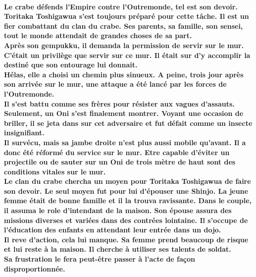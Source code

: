 \documentclass[10pt,a4paper]{book}
\begin{document}
\paragraph{Le crabe défends l’Empire contre l’Outremonde, tel est son devoir. Toritaka Toshigawua s’est toujours préparé pour cette tâche. Il est un fier combattant du clan du crabe. Ses parents, sa famille, son sensei, tout le monde attendait de grandes choses de sa part. \\
Après son gempukku, il demanda la permission de servir sur le mur. C’était un privilège que servir sur ce mur. Il était sur d'y accomplir la destiné que son entourage lui donnait.\\
Hélas, elle a choisi un chemin plus sinueux. A peine, trois jour après son arrivée sur le mur, une attaque a été lancé par les forces de l’Outremonde. \\
Il s'est battu comme ses frères pour résister aux vagues d’assauts. \\
Seulement, un Oni s’est finalement montrer. Voyant une occasion de briller, il se jeta dans sur cet adversaire et fut défait comme un insecte insignifiant.\\ Il survécu, mais sa jambe droite n'est plus aussi mobile qu’avant. Il a donc été réformé du service sur le mur. Etre capable d’éviter un projectile ou de sauter sur un Oni de trois mètre de haut sont des conditions vitales sur le mur.\\
Le clan du crabe chercha un moyen pour Toritaka Toshigawua de faire son devoir. Le seul moyen fut pour lui d’épouser une Shinjo. La jeune femme était de bonne famille et il la trouva ravissante. Dans le couple, il assuma le role d’intendant de la maison. Son épouse assura des missions diverses et variées dans des contrées lointaine. Il s’occupe de l’éducation des enfants en attendant leur entrée dans un dojo.\\
Il reve d’action, cela lui manque. Sa femme prend beaucoup de risque et lui reste à la maison. Il cherche à utiliser ses talents de soldat.\\ Sa frustration le fera peut-être passer à l’acte de façon disproportionnée. \\
}
\end{document}
